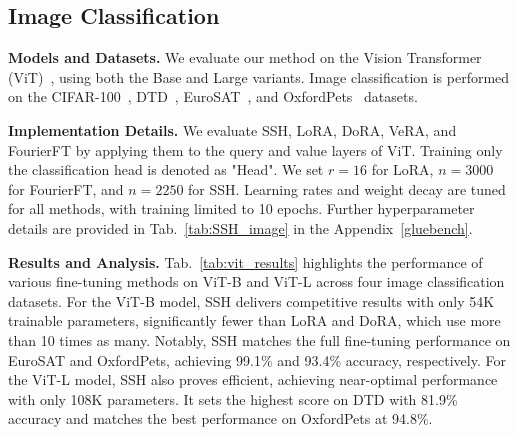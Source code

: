 

\subsection{Image Classification}

\noindent \textbf{Models and Datasets.}  
We evaluate our method on the Vision Transformer (ViT)~\cite{dosovitskiy2020image}, using both the Base and Large variants. Image classification is performed on the CIFAR-100~\cite{krause20133d}, DTD~\cite{cimpoi2014describing}, EuroSAT~\cite{helber2019eurosat}, and OxfordPets~\cite{parkhi2012cats} datasets.

\noindent \textbf{Implementation Details.}  
We evaluate SSH, LoRA, DoRA, VeRA, and FourierFT by applying them to the query and value layers of ViT. Training only the classification head is denoted as "Head". We set \( r = 16 \) for LoRA, \( n = 3000 \) for FourierFT, and \( n = 2250 \) for SSH. Learning rates and weight decay are tuned for all methods, with training limited to 10 epochs. Further hyperparameter details are provided in Tab.~\ref{tab:SSH_image} in the Appendix~\ref{gluebench}.






\noindent \textbf{Results and Analysis.}  
Tab.~\ref{tab:vit_results} highlights the performance of various fine-tuning methods on ViT-B and ViT-L across four image classification datasets. For the ViT-B model, SSH delivers competitive results with only 54K trainable parameters, significantly fewer than LoRA and DoRA, which use more than 10 times as many. Notably, SSH matches the full fine-tuning performance on EuroSAT and OxfordPets, achieving 99.1\% and 93.4\% accuracy, respectively. For the ViT-L model, SSH also proves efficient, achieving near-optimal performance with only 108K parameters. It sets the highest score on DTD with 81.9\% accuracy and matches the best performance on OxfordPets at 94.8\%. 



